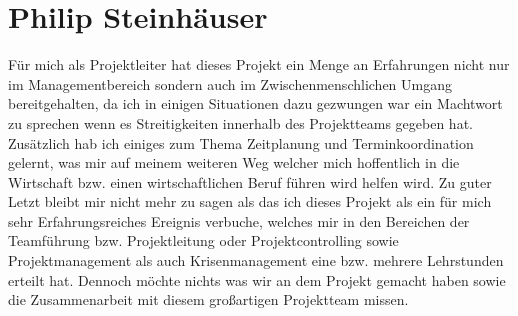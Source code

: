 \section{Philip Steinhäuser}
Für mich als Projektleiter hat dieses Projekt ein Menge an Erfahrungen  nicht nur im Managementbereich sondern auch im Zwischenmenschlichen Umgang bereitgehalten, da ich in einigen Situationen dazu gezwungen war ein Machtwort zu sprechen wenn es Streitigkeiten innerhalb des Projektteams gegeben hat. Zusätzlich hab ich einiges zum Thema Zeitplanung und Terminkoordination gelernt, was mir auf meinem weiteren Weg welcher mich hoffentlich in die Wirtschaft bzw. einen wirtschaftlichen Beruf führen wird helfen wird. Zu guter Letzt bleibt mir nicht mehr zu sagen als das ich dieses Projekt als ein für mich sehr Erfahrungsreiches Ereignis verbuche, welches mir in den Bereichen der Teamführung bzw. Projektleitung oder Projektcontrolling sowie Projektmanagement als auch Krisenmanagement eine bzw. mehrere Lehrstunden erteilt hat. Dennoch möchte nichts was wir an dem Projekt gemacht haben sowie die Zusammenarbeit mit diesem großartigen Projektteam missen.
